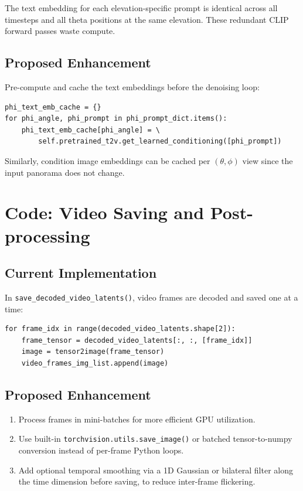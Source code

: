 \documentclass[11pt,a4paper]{article}
\newcommand{\fn}[1]{\texttt{#1}}
\begin{document}
The text embedding for each elevation-specific prompt is identical across all timesteps and all theta positions at the same elevation.
These redundant CLIP forward passes waste compute.

\subsection{Proposed Enhancement}

Pre-compute and cache the text embeddings before the denoising loop:
\begin{lstlisting}
phi_text_emb_cache = {}
for phi_angle, phi_prompt in phi_prompt_dict.items():
    phi_text_emb_cache[phi_angle] = \
        self.pretrained_t2v.get_learned_conditioning([phi_prompt])
\end{lstlisting}

Similarly, condition image embeddings can be cached per $(\theta, \phi)$ view since the input panorama does not change.

\section{Code: Video Saving and Post-processing}

\subsection{Current Implementation}

In \fn{save\_decoded\_video\_latents()}, video frames are decoded and saved one at a time:
\begin{lstlisting}
for frame_idx in range(decoded_video_latents.shape[2]):
    frame_tensor = decoded_video_latents[:, :, [frame_idx]]
    image = tensor2image(frame_tensor)
    video_frames_img_list.append(image)
\end{lstlisting}

\subsection{Proposed Enhancement}

\begin{enumerate}
    \item Process frames in mini-batches for more efficient GPU utilization.
    \item Use built-in \fn{torchvision.utils.save\_image()} or batched tensor-to-numpy conversion instead of per-frame Python loops.
    \item Add optional temporal smoothing via a 1D Gaussian or bilateral filter along the time dimension before saving, to reduce inter-frame flickering.
\end{enumerate}
\end{document}
